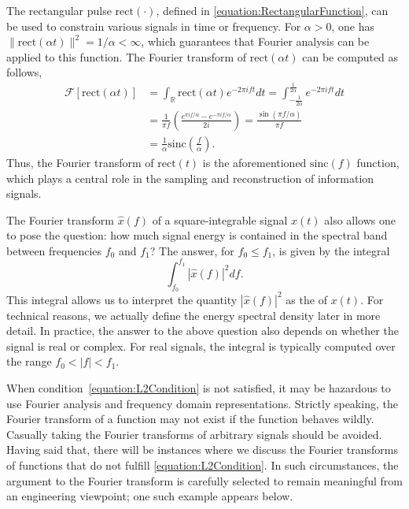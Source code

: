 \begin{example}
The rectangular pulse $\mathrm{rect} (\cdot)$, defined in \eqref{equation:RectangularFunction}, can be used to constrain various signals in time or frequency.
For $\alpha > 0$, one has $\| \mathrm{rect} (\alpha t) \|^2 = 1/\alpha < \infty$, which guarantees that Fourier analysis can be applied to this function.
The Fourier transform of $\mathrm{rect} (\alpha t)$ can be computed as follows,
\begin{equation*}
\begin{split}
\mathcal{F} \left[ \mathrm{rect} (\alpha t) \right]
&= \int_{\mathbb{R}} \mathrm{rect} (\alpha t) e^{- 2 \pi i f t} dt
= \int_{-\frac{1}{2\alpha}}^{\frac{1}{2\alpha}} e^{- 2 \pi i f t} dt \\
&= \frac{1}{\pi f} \left( \frac{e^{\pi i f/\alpha} - e^{- \pi i f/\alpha}}{2i} \right)
= \frac{ \sin ( \pi f/\alpha ) }{\pi f}  \\
&= \frac{1}{\alpha} \mathrm{sinc}\left( \frac{f}{\alpha} \right) .
\end{split}
\end{equation*}
Thus, the Fourier transform of $\mathrm{rect}(t)$ is the aforementioned $\mathrm{sinc}(f)$ function, which plays a central role in the sampling and reconstruction of information signals.
\end{example}

The Fourier transform $\hat{x}(f)$ of a square-integrable signal $x(t)$ also allows one to pose the question: how much signal energy is contained in the spectral band between frequencies $f_0$ and $f_1$?
The answer, for $f_0 \leq f_1$, is given by the integral
\[ \int_{f_0}^{f_1} \left| \hat{x}(f) \right|^2 df. \]
This integral allows us to interpret the quantity $\left| \hat{x}(f) \right|^2$ as the  of $x(t)$.
For technical reasons, we actually define the energy spectral density later in more detail.
In practice, the answer to the above question also depends on whether the signal is real or complex.
For real signals, the integral is typically computed over the range $f_0 < |f| < f_1$.

When condition~\eqref{equation:L2Condition} is not satisfied, it may be hazardous to use Fourier analysis and frequency domain representations.
Strictly speaking, the Fourier transform of a function may not exist if the function behaves wildly.
Casually taking the Fourier transforms of arbitrary signals should be avoided.
Having said that, there will be instances where we discuss the Fourier transforms of functions that do not fulfill \eqref{equation:L2Condition}.
In such circumstances, the argument to the Fourier transform is carefully selected to remain meaningful from an engineering viewpoint; one such example appears below.

